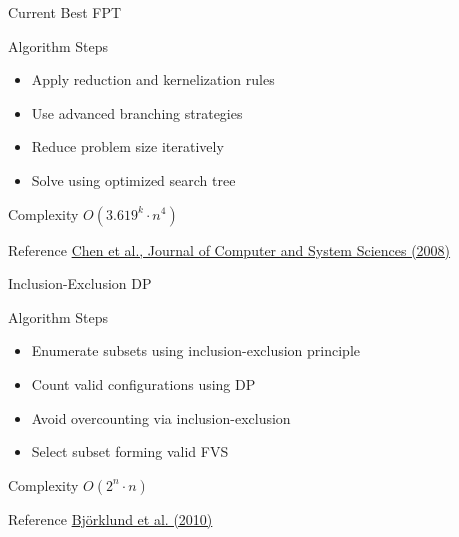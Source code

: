 \documentclass[aspectratio=169]{beamer}
\begin{document}
\begin{frame}{Current Best FPT}

\begin{block}{Algorithm Steps}
\begin{itemize}
\item Apply reduction and kernelization rules
\item Use advanced branching strategies
\item Reduce problem size iteratively
\item Solve using optimized search tree
\end{itemize}
\end{block}

\begin{exampleblock}{Complexity}
$O(3.619^k \cdot n^4)$
\end{exampleblock}

\begin{alertblock}{Reference}
\href{https://doi.org/10.1016/j.jcss.2008.05.002}{Chen et al., Journal of Computer and System Sciences (2008)}
\end{alertblock}

\end{frame}

\begin{frame}{Inclusion-Exclusion DP}

\begin{block}{Algorithm Steps}
\begin{itemize}
\item Enumerate subsets using inclusion-exclusion principle
\item Count valid configurations using DP
\item Avoid overcounting via inclusion-exclusion
\item Select subset forming valid FVS
\end{itemize}
\end{block}

\begin{exampleblock}{Complexity}
$O(2^n \cdot n)$
\end{exampleblock}

\begin{alertblock}{Reference}
\href{https://epubs.siam.org/doi/10.1137/1.9781611973099.139}{Björklund et al. (2010)}
\end{alertblock}

\end{frame}
\end{document}
